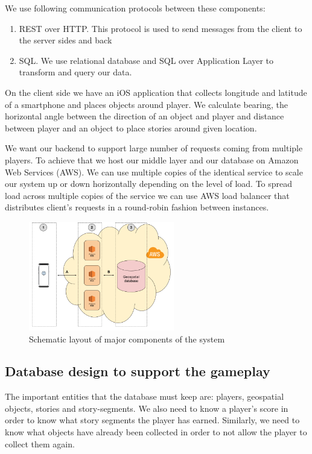 \documentclass[conference]{IEEEtran}
\begin{document}
We use following communication protocols between these components:

\begin{enumerate}[label=\Alph*]
\item REST over HTTP. This protocol is used to send messages from the client to the server sides and back
\item SQL. We use relational database and SQL over Application Layer to transform and query our data. 
\end{enumerate}

On the client side we have an iOS application that collects longitude and latitude of a smartphone and places objects around player. We calculate bearing, the horizontal angle between the direction of an object and player and distance between player and an object to place stories around given location. 

We want our backend to support large number of requests coming from multiple players. To achieve that we host our middle layer and our database on  Amazon Web Services (AWS).  We can use multiple copies of the identical service to scale our system up or down horizontally depending on the level of load.  To spread load across multiple copies of the service we can use AWS load balancer that distributes client’s requests in a round-robin fashion between instances. 

\begin{figure}[h]
\centering
\includegraphics[width=2.5in]{imgs/systemschema.png}
\caption{Schematic layout of major components of the system}
\label{schema}
\end{figure}

\subsection{Database design to support the gameplay}

The important entities that the database must keep are: players, geospatial objects, stories and story-segments. We also need to know a player’s score in order to know what story segments the player has earned. Similarly, we need to know what objects have already been collected in order to not allow the player to collect them again. 
\end{document}
